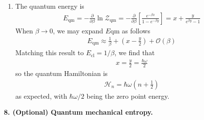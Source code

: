 \documentclass{article}
\theoremstyle{definition}
\newcommand{\p}{\partial}
\newcommand{\ham}{\mathcal{H}}
\newcommand{\be}{\beta}
\newcommand{\f}[2]{\frac{#1}{#2}}
\newcommand{\lp}{\left(}
\newcommand{\rp}{\right)}
\newcommand{\lb}{\left[}
\newcommand{\rb}{\right]}
\begin{document}
\begin{enumerate}[label=(\alph*)]
	\item The quantum energy is 
	\begin{align*}
	E_\text{qm} = -\f{\p}{\p \be}\ln \mathcal{Z}_\text{qm} = -\f{\p}{\p \be} \lb \f{e^{-\be x}}{ 1 - e^{-\be y}}  \rb = \boxed{x + \f{y}{e^{\be y} - 1}}
	\end{align*}
	When $\be \to 0$, we may expand $E\text{qm}$ as follows 
	\begin{align*}
	E_\text{qm} \approx \f{1}{\be} + \lp x - \f{y}{2}  \rp + \mathcal{O}(\be)	
	\end{align*}
	Matching this result to $E_\text{cl} = 1/\be$, we find that
	\begin{align*}
	x = \f{y}{2} = \boxed{\f{\hbar \omega}{2}}
	\end{align*}
	so the quantum Hamiltonian is 
	\begin{align*}
	\ham_n = \hbar \omega\lp n + \f{1}{2} \rp
	\end{align*}
	as expected, with $\hbar\omega/2$ being the zero point energy. 
\end{enumerate}

\noindent \textbf{8. (Optional) Quantum mechanical entropy.}
\end{document}
